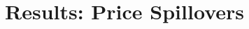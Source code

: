 \documentclass[12pt]{article}
\begin{document}







\section{Results: Price Spillovers}\label{section:resultsprices}
\end{document}
